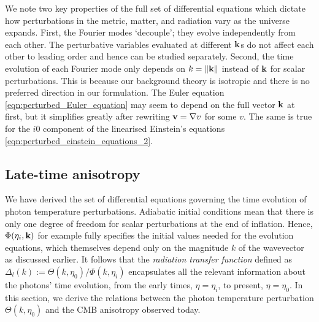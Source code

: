 We note two key properties of the full set of differential equations which dictate how perturbations in the metric, matter, and radiation vary as the universe expands. First, the Fourier modes `decouple'; they evolve independently from each other. The perturbative variables evaluated at different $\mathbf{k}$s do not affect each other to leading order and hence can be studied separately. Second, the time evolution of each Fourier mode only depends on $k=\|\mathbf{k}\|$ instead of $\mathbf{k}$ for scalar perturbations. This is because our background theory is isotropic and there is no preferred direction in our formulation. The Euler equation \eqref{eqn:perturbed_Euler_equation} may seem to depend on the full vector $\mathbf{k}$ at first, but it simplifies greatly after rewriting $\mathbf{v}=\nabla v$ for some $v$. The same is true for the $i0$ component of the linearised Einstein's equations \eqref{eqn:perturbed_einstein_equations_2}. 

\iffalse
We note that it is the free-streaming of photons that causes adjacent $l$ multipoles of the temperature perturbations to mix. The first two equations of the Boltzmann hierarchy are 
\begin{align}
	\Theta'_0 + k\Theta_1 &= \Phi' \\
	\Theta'_1 - \frac{1}{3} k\Theta_0 +\frac{2}{3} k\Theta_2 &= \frac{1}{3} k \Psi + \tau'(\Theta_1 + \frac{1}{3} k v_b)
\end{align}

Note the energy-momentum tensor
\begin{align}
	T^{\mu\nu} = \int \frac{d^3 \vv{p}}{E(\vv{p})} f(\vv{p}) p^i p^j
\end{align}
in the rest frame. Note the integration measure is Lorentz invariant. Have $\delta_\gamma = 4\Theta_0$, $v_\gamma = (-3i/k) \Theta_1$, and $\Pi_\gamma = -3\Theta_2$.
\fi


\subsection{Late-time anisotropy}

We have derived the set of differential equations governing the time evolution of photon temperature perturbations. Adiabatic initial conditions mean that there is only one degree of freedom for scalar perturbations at the end of inflation. Hence, $\Phi(\eta_i,\mathbf{k})$ for example fully specifies the initial values needed for the evolution equations, which themselves depend only on the magnitude $k$ of the wavevector as discussed earlier. It follows that the \textit{radiation transfer function} defined as $\Delta_l(k) := \Theta(k,\eta_0) / \Phi(k,\eta_i) $ encapsulates all the relevant information about the photons' time evolution, from the early times, $\eta=\eta_i$, to present, $\eta=\eta_0$. In this section, we derive the relations between the photon temperature perturbation $\Theta(k,\eta_0)$ and the CMB anisotropy observed today.

